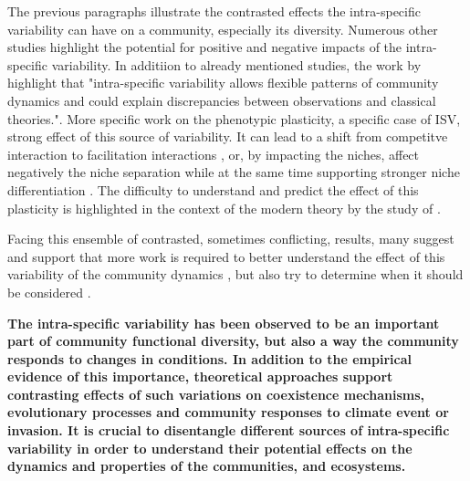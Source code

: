 The previous paragraphs illustrate the contrasted effects the intra-specific variability can have on a community, especially its diversity. Numerous other studies highlight the potential for positive and negative impacts of the intra-specific variability. In additiion to already mentioned studies, the work by \cite{courbaud_intra-specific_2010} highlight that "intra-specific variability allows flexible patterns of community dynamics and could explain discrepancies between observations and classical theories.". More specific work on the phenotypic plasticity, a specific case of ISV, strong effect of this source of variability. It can lead to a shift from competitve interaction to facilitation interactions \parencite{callaway_phenotypic_2003}, or, by impacting the niches, affect negatively the niche separation while at the same time supporting stronger niche differentiation \parencite{roscher_contrasting_2015}. The difficulty to understand and predict the effect of this plasticity is highlighted in the context of the modern theory by the study of \cite{turcotte_phenotypic_2016}. 

Facing this ensemble of contrasted, sometimes conflicting, results, many suggest and support that more work is required to better understand the effect of this variability of the community dynamics \parencite{ bolnick_why_2011, violle_return_2012, valladares_species_2015}, but also try to determine when it should be considered \parencite{albert_when_2011}.

%

\textbf{The intra-specific variability has been observed to be an important part of community functional diversity, but also a way the community responds to changes in conditions. In addition to the empirical evidence of this importance, theoretical approaches support contrasting effects of such variations on coexistence mechanisms, evolutionary processes and community responses to climate event or invasion. It is crucial to disentangle different sources of intra-specific variability in order to understand their potential effects on the dynamics and properties of the communities, and ecosystems.}

